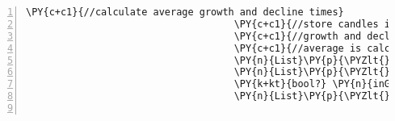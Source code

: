 \begin{Verbatim}[commandchars=\\\{\},numbers=left,firstnumber=1,stepnumber=1,numberblanklines=0]
                                    \PY{c+c1}{//calculate average growth and decline times}
                                    \PY{c+c1}{//store candles in a temporary list to retrieve their times when not in growth/decline anymore}
                                    \PY{c+c1}{//growth and decline times are stored in a list of timespans}
                                    \PY{c+c1}{//average is calculated afterwards}
                                    \PY{n}{List}\PY{p}{\PYZlt{}}\PY{n}{TimeSpan}\PY{p}{\PYZgt{}} \PY{n}{growthTimes} \PY{p}{=} \PY{k}{new} \PY{n}{List}\PY{p}{\PYZlt{}}\PY{n}{TimeSpan}\PY{p}{\PYZgt{}}\PY{p}{(}\PY{p}{)}\PY{p}{;}
                                    \PY{n}{List}\PY{p}{\PYZlt{}}\PY{n}{TimeSpan}\PY{p}{\PYZgt{}} \PY{n}{declineTimes} \PY{p}{=} \PY{k}{new} \PY{n}{List}\PY{p}{\PYZlt{}}\PY{n}{TimeSpan}\PY{p}{\PYZgt{}}\PY{p}{(}\PY{p}{)}\PY{p}{;}
                                    \PY{k+kt}{bool?} \PY{n}{inGrowth} \PY{p}{=} \PY{k}{null}\PY{p}{;}
                                    \PY{n}{List}\PY{p}{\PYZlt{}}\PY{n}{Candle}\PY{p}{\PYZgt{}} \PY{n}{growthCandles} \PY{p}{=} \PY{k}{new} \PY{n}{List}\PY{p}{\PYZlt{}}\PY{n}{Candle}\PY{p}{\PYZgt{}}\PY{p}{(}\PY{p}{)}\PY{p}{;}


\end{Verbatim}
